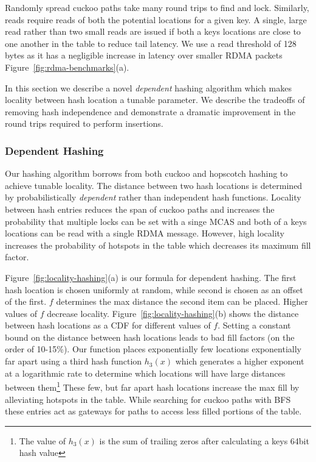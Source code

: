 Randomly spread cuckoo paths take many round trips to find and lock.
Similarly, reads require reads of both the potential locations for a
given key.  A single, large read rather than two small reads are issued
if both a keys locations are close to one another in the table to
reduce tail latency. We use a read threshold of 128 bytes as it has a
negligible increase in latency over smaller RDMA packets
Figure~\ref{fig:rdma-benchmarks}(a).


In this section we describe a novel
\textit{dependent} hashing algorithm which makes locality
between hash location a tunable parameter. We describe the
tradeoffs of removing hash independence and demonstrate a
dramatic improvement in the round trips required to perform
insertions.


\subsubsection{Dependent Hashing}

Our hashing algorithm borrows from both cuckoo and hopscotch
hashing to achieve tunable locality. The distance between
two hash locations is determined by probabilistically
\textit{dependent} rather than independent hash functions.
Locality between hash entries reduces the span of cuckoo
paths and increases the probability that multiple locks can
be set with a singe MCAS and both of a keys locations can be read
with a single RDMA message. However, high locality increases
the probability of hotspots in the table which decreases its
maximum fill factor.

Figure~\ref{fig:locality-hashing}(a) is our formula for
dependent hashing. The first hash location is chosen
uniformly at random, while second is chosen as an offset of
the first.  $f$ determines the max distance the second item
can be placed. Higher values of $f$ decrease locality.
Figure~\ref{fig:locality-hashing}(b) shows the distance
between hash locations as a CDF for different values of $f$.
Setting a constant bound on the distance between hash
locations leads to bad fill factors (on the order of
10-15\%). Our function places exponentially few locations
exponentially far apart using a third hash function $h_3(x)$
which generates a higher exponent at a logarithmic rate to
determine which locations will have large distances between
them\footnote{The value of $h_3(x)$ is the sum of trailing
zeros after calculating a keys 64bit hash value} These few,
but far apart hash locations increase the max fill by
alleviating hotspots in the table. While searching for
cuckoo paths with BFS these entries act as gateways for
paths to access less filled portions of the table. 

